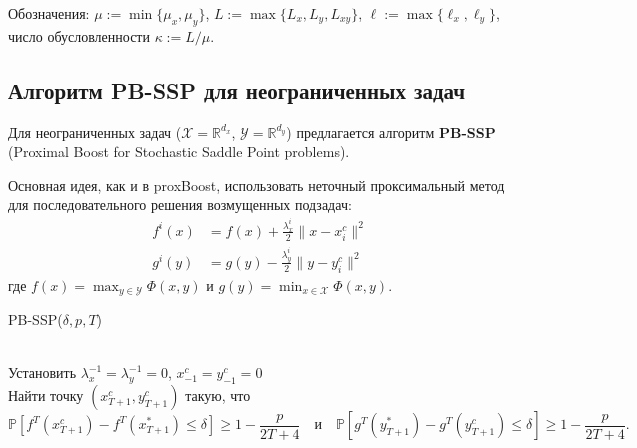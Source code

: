 Обозначения: $\mu := \min\{\mu_x, \mu_y\}$, $L := \max\{L_x, L_y, L_{xy}\}$, $\ell := \max\{\ell_x, \ell_y\}$, число обусловленности $\kappa := L/\mu$.

\subsection{Алгоритм PB-SSP для неограниченных задач}

Для неограниченных задач ($\mathcal{X} = \mathbb{R}^{d_x}$, $\mathcal{Y} = \mathbb{R}^{d_y}$) предлагается алгоритм \textbf{PB-SSP} (Proximal Boost for Stochastic Saddle Point problems).

Основная идея, как и в \textrm{proxBoost}, использовать неточный проксимальный метод для последовательного решения возмущенных подзадач:
\begin{align}
f^i(x) &= f(x) + \frac{\lambda_x^i}{2}\|x - x_i^c\|^2\\
g^i(y) &= g(y) - \frac{\lambda_y^i}{2}\|y - y_i^c\|^2
\end{align}
где $f(x) = \max_{y \in \mathcal{Y}} \Phi(x,y)$ и $g(y) = \min_{x \in \mathcal{X}} \Phi(x,y)$.



\begin{algorithm}[H]
\caption{PB-SSP($\delta, p, T$)}
 \\
Установить $\lambda_x^{-1} = \lambda_y^{-1} = 0$, $x_{-1}^c = y_{-1}^c = 0$
\\
Найти точку $(x_{T+1}^c, y_{T+1}^c)$ такую, что \begin{equation*}
    \mathbb{P}[f^T(x_{T+1}^c)-f^T(x^*_{T+1})\leq \delta ] \geq 1-\frac{p}{2T+4} \quad \text{и} \quad
    \mathbb{P}[g^T(y^*_{T+1})-g^T(y_{T+1}^c)\leq \delta ] \geq 1-\frac{p}{2T+4}.
    \label{equ: high prob x and y last round}
\end{equation*}
\end{algorithm}

